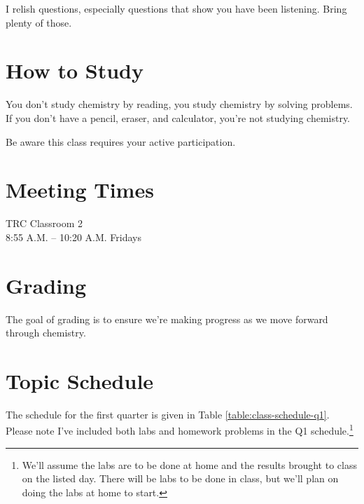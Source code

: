 \documentclass[11pt, oneside]{article}   	%
\begin{document}
I relish questions, especially questions that show you have been listening. Bring plenty of those.

\section{How to Study}
You don't study chemistry by reading, you study chemistry by solving problems.
If you don't have a pencil, eraser, and calculator, you're not studying chemistry.

Be aware this class requires your active participation.

\section{Meeting Times}
TRC Classroom 2       \\
8:55 A.M. -- 10:20 A.M. Fridays \\ 

\section{Grading}
The goal of grading is to ensure we're making progress as we move forward through chemistry. 

\section{Topic Schedule}
The schedule for the first quarter is given in Table \ref{table:class-schedule-q1}.
Please note I've included both labs and homework problems in the Q1 schedule.\footnote{We'll assume the labs are to be done at home and the results brought to class on the listed day. There will be labs to be done in class, but we'll plan on doing the labs at home to start.}
\end{document}
